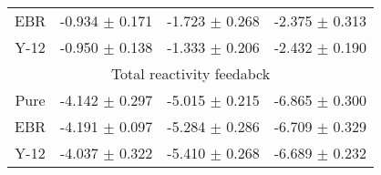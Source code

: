 \begin{table}
\begin{tabular}{c c c c}
                \gls{EBR} &-0.934 $\pm$ 0.171 & -1.723 $\pm$ 0.268 & -2.375 $\pm$ 0.313\\
                Y-12 & -0.950 $\pm$ 0.138 & -1.333 $\pm$ 0.206 & -2.432 $\pm$ 0.190\\
                \hline 
                \multicolumn{4}{c}{Total reactivity feedabck}\\
                Pure & -4.142 $\pm$ 0.297 & -5.015 $\pm$ 0.215 & -6.865 $\pm$ 0.300\\
                \gls{EBR} & -4.191 $\pm$ 0.097 & -5.284 $\pm$ 0.286 & -6.709 $\pm$ 0.329\\
                Y-12 & -4.037 $\pm$ 0.322 & -5.410 $\pm$ 0.268 & -6.689 $\pm$ 0.232\\
                \hline 
                
                
        \end{tabular}
\end{table}